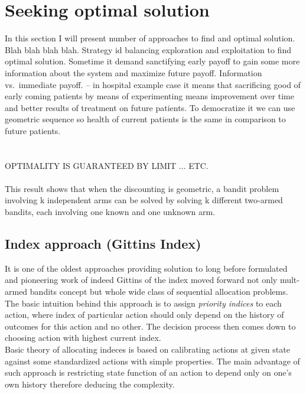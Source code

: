 \documentclass[12pt, a4paper, pdflatex, leqno]{report}
\begin{document}
\section{Seeking optimal solution}
In this section I will present number of approaches to find and optimal solution.\\
Blah blah blah blah.
Strategy id balancing exploration and exploitation to find optimal solution. Sometime it demand sanctifying early payoff to gain some more information about the system and maximize future payoff.
Information vs.\ immediate payoff. -- in hospital example case it means that sacrificing good of early coming patients by means of experimenting means improvement over time and better results of treatment on future patients.
To democratize it we can use geometric sequence so health of current patients is the same in comparison to future patients.\\
\\
\\
OPTIMALITY IS GUARANTEED BY LIMIT ... ETC.
\\
\\
This result shows that when the discounting is geometric, a bandit problem involving k independent arms can be solved by solving k different two-armed bandits, each involving one known and one unknown arm.\\

\subsection{Index approach (Gittins Index)\label{sec:gitind}}
It is one of the oldest approaches providing solution to long before formulated and pioneering work of indeed Gittins of the index moved forward not only mult-armed bandits concept but whole wide class of sequential allocation problems.\\

The basic intuition behind this approach is to assign \emph{priority indices} to each action, where index of particular action should only depend on the history of outcomes for this action and no other. The decision process then comes down to choosing action with highest current index.\\

Basic theory of allocating indeces is based on calibrating actions at given state against some standardized actions with simple properties. The main advantage of such approach is restricting state function of an action to depend only on one's own history therefore deducing the complexity.\\
\end{document}
